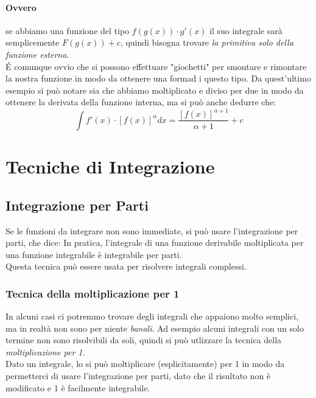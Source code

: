 \documentclass[12pt, a4paper, openany]{book}
\begin{document}
	\paragraph*{Ovvero} se abbiamo una funzione del tipo $f(g(x)) \cdot g'(x)$ il suo integrale sarà semplicemente $F(g(x)) + c$, quindi bisogna trovare \emph{la primitiva solo della funzione esterna}.
	\\\'E comunque ovvio che si possono effettuare "giochetti" per smontare e rimontare la nostra funzione in modo da ottenere una formad i questo tipo.
	Da quest'ultimo esempio si può notare sia che abbiamo moltiplicato e diviso per due in modo da ottenere la derivata della funzione interna,
	ma si può anche dedurre che:
	$$
	\int f'(x) \cdot [ f(x)]^\alpha dx = \frac{[f(x)]^{\alpha+1}}{\alpha + 1} + c
	$$

	\section{Tecniche di Integrazione}

	\subsection{Integrazione per Parti}
	Se le funzioni da integrare non sono immediate, si può usare l'integrazione per parti, che dice:
	In pratica, l'integrale di una funzione derivabile moltiplicata per una funzione integrabile è integrabile per parti.
	\\Questa tecnica può essere usata per risolvere integrali complessi.
	\subsubsection*{Tecnica della moltiplicazione per 1}
	In alcuni casi ci potremmo trovare degli integrali che appaiono molto semplici, ma in realtà non sono per niente \emph{banali}.
	Ad esempio alcuni integrali con un solo termine non sono risolvibili da soli, quindi si può utlizzare la tecnica della \emph{moltiplicazione per 1}.
	\\Dato un integrale, lo si può moltiplicare (esplicitamente) per 1 in modo da permetterci di usare l'integrazione per parti, dato che il risultato non è modificato e 1 è facilmente integrabile.
\end{document}
